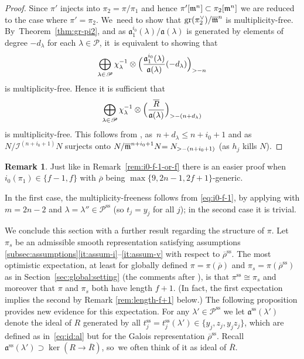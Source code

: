 \documentclass[JEP,XML,SOM,Unicode,NoFloatCountersInSection, NoEqCountersInSection,published]{cedram}
\let\ovl\overline
\renewcommand{\P}{\mathscr P}
\renewcommand{\ss}{\mathrm{ss}}
\newcommand{\fa}{\mathfrak{a}}
\newcommand{\rhobar}{\overline{\rho}}
\newcommand{\brho}{\overline{\rho}}
\DeclareMathOperator{\gr}{gr}
\theoremstyle{plain}
\theoremstyle{definition}
\newtheorem{rem}[prop]{Remark}
\begin{document}
\begin{proof}
Since $\pi'$ injects into $\pi_2 = \pi/\pi_1$ and hence $\pi'[\mathfrak{m}^n] \subset \pi_2[\mathfrak{m}^n]$ we are reduced to the case where $\pi'=\pi_2$. We~need to show that $\gr(\pi_2^\vee)/\ovl\m^n$ is multiplicity-free. By~Theorem~\ref{thm:gr-pi2}, and as ${\mathfrak{a}_1^{i_0}(\lambda)}/{\mathfrak{a}(\lambda)}$ is generated by elements of degree $-d_\lambda$ for each $\lambda \in \P$, it~is equivalent to showing that\vspace*{-3pt}
\begin{equation*}
\bigoplus_{\lambda \in \P} \chi_\lambda^{-1} \otimes \Bigl(\frac{\mathfrak{a}_1^{i_0}(\lambda)}{\mathfrak{a}(\lambda)}(-d_\lambda)\Bigr)_{> -n}
\end{equation*}
is multiplicity-free.
Hence it is sufficient that\vspace*{-3pt}
\begin{equation*}
\bigoplus_{\lambda \in \P} \chi_\lambda^{-1} \otimes \Bigl(\frac{\ovl R}{\mathfrak{a}(\lambda)}\Bigr)_{> -(n+d_\lambda)}
\end{equation*}
is multiplicity-free.
This follows from \cite[Lem.\,2.3.7]{BHHMS4}, as~$n+d_\lambda \le n+i_0+1$ and as $N/\mathcal{I}^{(n+i_0+1)}N$ surjects onto $N/\ovl\m^{n+i_0+1} N {= N_{>-(n+i_0+1)}}$ {(as $h_j$ kills $N$)}.
\end{proof}

\begin{rem}\label{rem2:i0-f-1-or-f}
Just like in Remark~\ref{rem:i0-f-1-or-f} there is an easier proof when $i_0(\pi_1) \in \{f-1,f\}$ {with $\rhobar$ being $\max\{9,2n-1,2f+1\}$-generic}.

In the first case, the multiplicity-freeness {follows from \eqref{eq:i0-f-1}, by applying \cite[Lem.\,2.3.6(ii)]{BHHMS4} with $m = 2n-2$ and $\lambda = \lambda'' \in \P^\ss$ (so $t_j = y_j$ for all $j$)}; in the second case it is trivial.
\end{rem}

We conclude this section with a further result regarding the structure of $\pi$. Let~$\pi_s$ be an admissible smooth representation satisfying assumptions \ref{subsec:assumptions}\eqref{it:assum-i}--\eqref{it:assum-v} with respect to $\rhobar^{\ss}$.
The most optimistic expectation, {at least for globally defined $\pi = \pi(\brho)$ and $\pi_s = \pi(\brho^\ss)$ as in Section~\ref{sec:global:setting}} (\cf the comments after \cite[Th.\,19.10]{BP}), is that $\pi^\ss \cong \pi_s$ and moreover that $\pi$ and $\pi_s$ both have length $f+1$.
{(In fact, the first expectation implies the second by Remark \ref{rem:length-f+1} below.)}
The following proposition provides new evidence for this expectation.
For any $\lambda' \in \P^\ss$ we let $\fa^\ss(\lambda')$ denote the ideal of $R$ generated by all $t_j^\ss = t_j^\ss(\lambda') \in \{y_j,z_j,y_jz_j\}$, which are defined as in~\eqref{eq:id:al} but for the Galois representation $\brho^\ss$. Recall $\fa^\ss(\lambda') \supset \ker(R \to \ovl R)$, so~we often think of it as ideal of $\ovl R$.
\end{document}
